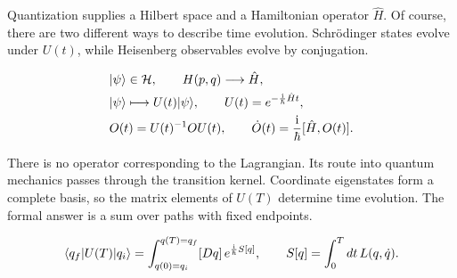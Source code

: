 Quantization supplies a Hilbert space and a Hamiltonian operator $\hat H$. Of course, there are two different ways to describe time evolution. Schr\"odinger states evolve under $U(t)$, while Heisenberg observables evolve by conjugation.

\begin{align}
  &\lvert \psi\rangle\in\mathcal H,
  \qquad H(p,q)\longrightarrow\hat H,
  \label{eq:253a-ch02-quantum-bridge}\\
  &\lvert \psi\rangle\longmapsto U(t)\lvert \psi\rangle,
  \qquad U(t)=e^{-\frac{\mathrm{i}}{\hbar}\hat Ht},
  \label{eq:253a-ch02-schrodinger-evolution}\\
  &O(t)=U(t)^{-1}OU(t),
  \qquad \dot O(t)=\frac{\mathrm{i}}{\hbar}[\hat H,O(t)].
  \label{eq:253a-ch02-heisenberg-evolution}
\end{align}

There is no operator corresponding to the Lagrangian. Its route into quantum mechanics passes through the transition kernel. Coordinate eigenstates form a complete basis, so the matrix elements of $U(T)$ determine time evolution. The formal answer is a sum over paths with fixed endpoints.

\begin{equation}
  \langle q_f\rvert U(T)\lvert q_i\rangle
  =\int_{q(0)=q_i}^{q(T)=q_f}[Dq]\,
  e^{\frac{\mathrm{i}}{\hbar}S[q]},
  \qquad
  S[q]=\int_0^Tdt\,L(q,\dot q).
  \label{eq:253a-ch02-formal-kernel}
\end{equation}

